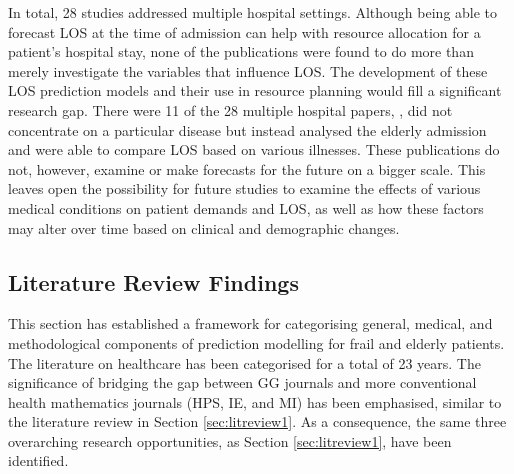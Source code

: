 \documentclass[../thesis.tex]{subfiles}
\begin{document}
In total, 28 studies addressed multiple hospital settings. Although being able to forecast LOS at the time of admission can help with resource allocation for a patient's hospital stay, none of the publications were found to do more than merely investigate the variables that influence LOS. The development of these LOS prediction models and their use in resource planning would fill a significant research gap. 
There were 11 of the 28 multiple hospital papers, \cite{Garg2011,Hubbard2017,Kim2018,Lang2006,Liotta2012,Lisk2018,Naouri2022,Pilotto2016,Shebeshi2021,Volpato2014,Wong2008}, did not concentrate on a particular disease but instead analysed the elderly admission and were able to compare LOS based on various illnesses. These publications do not, however, examine or make forecasts for the future on a bigger scale. This leaves open the possibility for future studies to examine the effects of various medical conditions on patient demands and LOS, as well as how these factors may alter over time based on clinical and demographic changes.

\subsection{Literature Review Findings}\label{sec:lr2findings}

This section has established a framework for categorising general, medical, and methodological components of prediction modelling for frail and elderly patients. The literature on healthcare has been categorised for a total of 23 years. The significance of bridging the gap between GG journals and more conventional health mathematics journals (HPS, IE, and MI) has been emphasised, similar to the literature review in Section \ref{sec:litreview1}. As a consequence, the same three  overarching research opportunities, as Section \ref{sec:litreview1}, have been identified.
\end{document}
